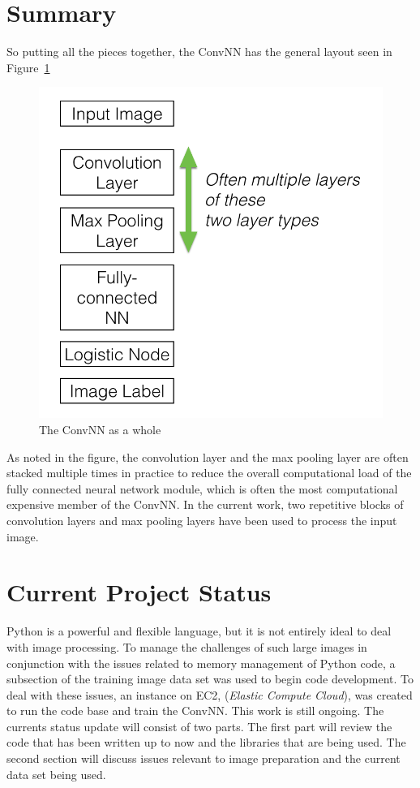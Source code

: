 \documentclass[letterpaper,12pt]{article}
\newcommand{\figref}[1]{Figure~\ref{#1}}
\begin{document}
\section{Summary}

So putting all the pieces together,  the ConvNN has the general layout seen in \figref{summary}

\begin{figure}[htbp]
\begin{center}
\includegraphics[scale=0.6]{images/summaryNN.png}
\caption{The ConvNN as a whole}
\label{summary}
\end{center}
\end{figure}

As noted in the figure, the convolution layer and the max pooling layer are often stacked multiple times in practice to reduce the overall computational load of the fully connected neural network module, which is often the most computational expensive member of the ConvNN. In the current work, two repetitive blocks of convolution layers and max pooling layers have been used to process the input image.

\section{Current Project Status}

Python is a powerful and flexible language, but it is not entirely ideal to deal with image processing. To manage the challenges of such large images in conjunction with the issues related to memory management of Python code, a subsection of the training image data set was used to begin code development. To deal with these issues, an instance on EC2, (\textit{Elastic Compute Cloud}), was created to run the code base and train the ConvNN. This work is still ongoing. The currents status update will consist of two parts. The first part will review the code that has been written up to now and the libraries that are being used. The second section will discuss issues relevant to image preparation and the current data set being used. 
\end{document}
